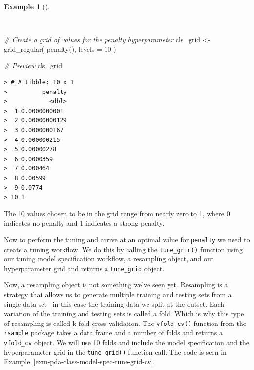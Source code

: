 \documentclass[
  letterpaper,
  DIV=11,
  numbers=noendperiod]{scrreprt}
\newenvironment{Shaded}{\begin{snugshade}}{\end{snugshade}}
\newcommand{\AttributeTok}[1]{\textcolor[rgb]{0.00,0.00,0.00}{#1}}
\newcommand{\CommentTok}[1]{\textcolor[rgb]{0.00,0.00,0.00}{\textit{#1}}}
\newcommand{\DecValTok}[1]{\textcolor[rgb]{0.00,0.00,0.00}{#1}}
\newcommand{\FunctionTok}[1]{\textcolor[rgb]{0.00,0.00,0.00}{#1}}
\newcommand{\NormalTok}[1]{\textcolor[rgb]{0.00,0.00,0.00}{#1}}
\newcommand{\OtherTok}[1]{\textcolor[rgb]{0.00,0.00,0.00}{#1}}
\theoremstyle{definition}
\newtheorem{example}{Example}[chapter]
\theoremstyle{remark}
\begin{document}
\begin{example}[]\protect\hypertarget{exm-pda-class-model-spec-tune-grid-values}{}\label{exm-pda-class-model-spec-tune-grid-values}

~

\begin{Shaded}
\begin{Highlighting}[]
\CommentTok{\# Create a grid of values for the penalty hyperparameter}
\NormalTok{cls\_grid }\OtherTok{\textless{}{-}}
  \FunctionTok{grid\_regular}\NormalTok{(}
    \FunctionTok{penalty}\NormalTok{(),}
    \AttributeTok{levels =} \DecValTok{10}
\NormalTok{    )}

\CommentTok{\# Preview}
\NormalTok{cls\_grid}
\end{Highlighting}
\end{Shaded}

\begin{verbatim}
> # A tibble: 10 x 1
>          penalty
>            <dbl>
>  1 0.0000000001 
>  2 0.00000000129
>  3 0.0000000167 
>  4 0.000000215  
>  5 0.00000278   
>  6 0.0000359    
>  7 0.000464     
>  8 0.00599      
>  9 0.0774       
> 10 1
\end{verbatim}

\end{example}

The 10 values chosen to be in the grid range from nearly zero to 1,
where 0 indicates no penalty and 1 indicates a strong penalty.

Now to perform the tuning and arrive at an optimal value for
\texttt{penalty} we need to create a tuning workflow. We do this by
calling the \texttt{tune\_grid()} function using our tuning model
specification workflow, a resampling object, and our hyperparameter grid
and returns a \texttt{tune\_grid} object.

Now, a resampling object is not something we've seen yet. Resampling is
a strategy that allows us to generate multiple training and testing sets
from a single data set --in this case the training data we split at the
outset. Each variation of the training and testing sets is called a
fold. Which is why this type of resampling is called k-fold
cross-validation. The \texttt{vfold\_cv()} function from the
\texttt{rsample} package takes a data frame and a number of folds and
returns a \texttt{vfold\_cv} object. We will use 10 folds and include
the model specification and the hyperparameter grid in the
\texttt{tune\_grid()} function call. The code is seen in
Example~\ref{exm-pda-class-model-spec-tune-grid-cv}.
\end{document}
